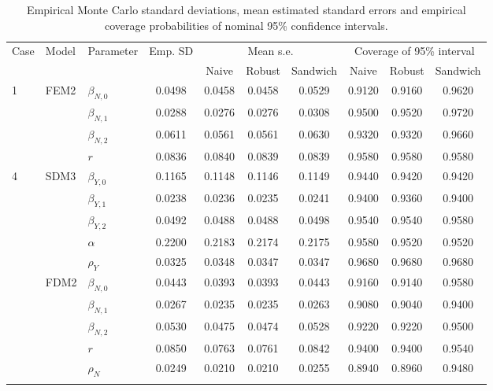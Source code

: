 \documentclass[11pt]{article}
\begin{document}
{\begin{table}[h!]
\footnotesize
\centering
\begin{tabular}{lllccccccc}
\toprule
Case & Model & Parameter & Emp. SD & \multicolumn{3}{c}{Mean s.e.} & \multicolumn{3}{c}{Coverage of 95\% interval} \\
\cmidrule(lr){5-7} \cmidrule(lr){8-10}
 & & & & Naive & Robust & Sandwich & Naive & Robust & Sandwich \\
\midrule
 1 & FEM2  & $\beta_{N,0}$ & 0.0498 & 0.0458 & 0.0458 & 0.0529 & 0.9120 & 0.9160 & 0.9620\\
 && $\beta_{N,1}$ & 0.0288 & 0.0276 & 0.0276 & 0.0308 & 0.9500 & 0.9520 & 0.9720 \\
 && $\beta_{N,2}$ & 0.0611 & 0.0561 & 0.0561 & 0.0630 & 0.9320 & 0.9320 & 0.9660 \\
 && $r$ & 0.0836 & 0.0840 & 0.0839 & 0.0839 & 0.9580 & 0.9580 & 0.9580 \\
\midrule
 4 & SDM3 & $\beta_{Y,0}$ & 0.1165 & 0.1148 & 0.1146 & 0.1149 & 0.9440 & 0.9420 & 0.9420 \\
 & & $\beta_{Y,1}$ & 0.0238 & 0.0236 & 0.0235 & 0.0241 & 0.9400 & 0.9360 & 0.9400 \\
 & & $\beta_{Y,2}$ & 0.0492 & 0.0488 & 0.0488 & 0.0498 & 0.9540 & 0.9540 & 0.9580 \\
 & & $\alpha$ & 0.2200 & 0.2183 & 0.2174 & 0.2175 & 0.9580 & 0.9520 & 0.9520 \\
 & & $\rho_Y$ & 0.0325 & 0.0348 & 0.0347 & 0.0347 & 0.9680 & 0.9680 & 0.9680 \\
\cmidrule(lr){2-10}
 & FDM2 & $\beta_{N,0}$ & 0.0443 & 0.0393 & 0.0393 & 0.0443 & 0.9160 & 0.9140 & 0.9580 \\
 && $\beta_{N,1}$ & 0.0267 & 0.0235 & 0.0235 & 0.0263 & 0.9080 & 0.9040 & 0.9400 \\
 && $\beta_{N,2}$ & 0.0530 & 0.0475 & 0.0474 & 0.0528 & 0.9220 & 0.9220 & 0.9500 \\
 && $r$ & 0.0850 & 0.0763 & 0.0761 & 0.0842 & 0.9400 & 0.9400 & 0.9540 \\
 && $\rho_N$ & 0.0249 & 0.0210 & 0.0210 & 0.0255 & 0.8940 & 0.8960 & 0.9480 \\
\hhline{==========}
\end{tabular}
\caption{Empirical Monte Carlo standard deviations,
mean estimated standard errors and empirical coverage probabilities of nominal 95\% confidence intervals. }%
\label{tab:sandwich}
\end{table}


}
\end{document}
